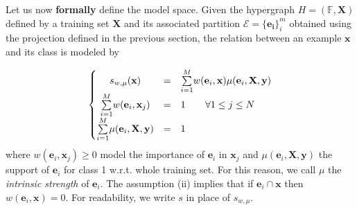 \documentclass[preprint,12pt]{elsarticle}
\theoremstyle{definition}
\begin{document}
Let us now {\bf formally} define the model space. Given the hypergraph $H = (\mathbb F, \mathbf{X})$ defined by a training set $\mathbf{X}$ and its associated partition $\mathcal{E} = \{\mathbf{e_i}\}_i^m$ obtained using the projection defined in the previous section, the relation between an example $\mathbf{x}$ and its class is modeled by

\begin{align}
\label{eqn:model}
\left\{\begin{matrix}
s_{w, \mu}(\mathbf{x}) & = & \underset{i = 1}{\overset{M}\sum} w(\mathbf{e}_i, \mathbf{x}) \mu(\mathbf{e}_i, \mathbf{X}, \mathbf{y})%
 \\
\underset{i = 1}{\overset{M}\sum} w(\mathbf{e}_i, \mathbf{x}_j) & = & 1 ~ \hfill \forall 1 \leq j \leq N \hfill\\
\underset{i = 1}{\overset{M}\sum} \mu(\mathbf{e}_i, \mathbf{X}, \mathbf{y}) & = & 1 \hfill
\end{matrix}\right.
\end{align} where $w(\mathbf{e}_i, \mathbf{x}_j) \geq 0$ model the importance of $\mathbf{e}_i$ in $\mathbf{x}_j$ and $\mu(\mathbf{e}_i, \mathbf{X}, \mathbf{y})$ the support of $\mathbf{e}_i$ for class 1 w.r.t. whole training set. For this reason, we call $\mu$ the {\it intrinsic strength} of $\mathbf e_i$. The assumption (ii) implies that if $\mathbf{e}_i \cap \mathbf{x}$ then $w(\mathbf{e}_i, \mathbf{x}) = 0$. For readability, we write $s$ in place of $s_{w, \mu}$.
\end{document}
